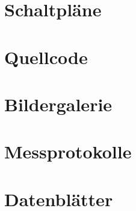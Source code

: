 \section{Schaltpl\"ane}


\section{Quellcode}


\section{Bildergalerie}


\section{Messprotokolle}


\section{Datenbl\"atter}
